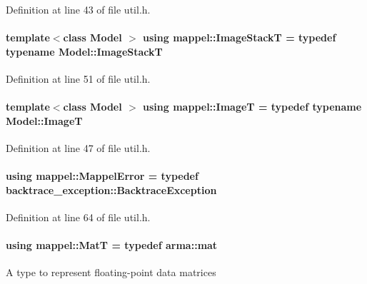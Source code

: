 Definition at line 43 of file util.\+h.

\paragraph[{\texorpdfstring{Image\+StackT}{ImageStackT}}]{\setlength{\rightskip}{0pt plus 5cm}template$<$class Model $>$ using {\bf mappel\+::\+Image\+StackT} = typedef typename Model\+::\+Image\+StackT}\hypertarget{namespacemappel_a636dbe5b195c267a5f6a65cd48ff94a6}{}\label{namespacemappel_a636dbe5b195c267a5f6a65cd48ff94a6}


Definition at line 51 of file util.\+h.

\paragraph[{\texorpdfstring{ImageT}{ImageT}}]{\setlength{\rightskip}{0pt plus 5cm}template$<$class Model $>$ using {\bf mappel\+::\+ImageT} = typedef typename Model\+::\+ImageT}\hypertarget{namespacemappel_a14658186b77757f3c35a69cb1be6cf4b}{}\label{namespacemappel_a14658186b77757f3c35a69cb1be6cf4b}


Definition at line 47 of file util.\+h.

\paragraph[{\texorpdfstring{Mappel\+Error}{MappelError}}]{\setlength{\rightskip}{0pt plus 5cm}using {\bf mappel\+::\+Mappel\+Error} = typedef backtrace\+\_\+exception\+::\+Backtrace\+Exception}\hypertarget{namespacemappel_a9a55f6aee1523ba336066874a36dc29c}{}\label{namespacemappel_a9a55f6aee1523ba336066874a36dc29c}


Definition at line 64 of file util.\+h.

\paragraph[{\texorpdfstring{MatT}{MatT}}]{\setlength{\rightskip}{0pt plus 5cm}using {\bf mappel\+::\+MatT} = typedef arma\+::mat}\hypertarget{namespacemappel_a7091ab87c528041f7e2027195fad8915}{}\label{namespacemappel_a7091ab87c528041f7e2027195fad8915}
A type to represent floating-\/point data matrices 

